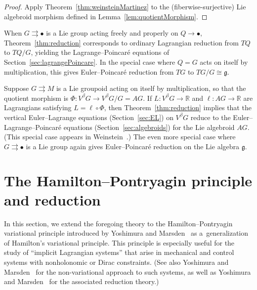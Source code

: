\documentclass[pdftex]{sigma}
\numberwithin{equation}{section}
\begin{document}
\begin{proof}
Apply Theorem~\ref{thm:weinsteinMartinez} to the (f\/iberwise-surjective) Lie algebroid morphism def\/ined in Lemma~\ref{lem:quotientMorphism}.
\end{proof}

\begin{Example} \label{ex:groupActionReduction}
When $G \rightrightarrows \bullet $ is a Lie group acting freely and properly on $ Q \rightarrow \bullet $, Theorem~\ref{thm:reduction} corresponds to ordinary Lagrangian reduction from $ T Q $ to $ T Q / G $, yielding the Lagrange--Poincar\'e equations of Section~\ref{sec:lagrangePoincare}. In the special case where $ Q = G $ acts on itself by multiplication, this gives Euler--Poincar\'e reduction from $ T G $ to $ T G / G \cong \mathfrak{g} $.
\end{Example}

\begin{Example}\label{ex:groupoidSelfReduction}
Suppose $G \rightrightarrows M $ is a Lie groupoid acting on itself by multiplication, so that the quotient morphism is $ \Phi \colon V ^\beta G \rightarrow V ^\beta G / G = A G $. If $ L \colon V ^\beta G \rightarrow \mathbb{R} $ and $ \ell \colon A G \rightarrow \mathbb{R} $ are Lagrangians satisfying $ L = \ell \circ \Phi $, then Theorem~\ref{thm:reduction} implies that the vertical Euler--Lagrange equations (Section~\ref{sec:EL}) on $ V ^\beta G $ reduce to the Euler--Lagrange--Poincar\'e equations (Section~\ref{sec:algebroids}) for the Lie algebroid $ A G $. (This special case appears in Weinstein~\cite[Theorem~5.3]{Weinstein1996}.) The even more special case where $ G \rightrightarrows \bullet $ is a Lie group again gives Euler--Poincar\'e reduction on the Lie algebra $ \mathfrak{g} $.
\end{Example}

\section{The Hamilton--Pontryagin principle and reduction}\label{sec:HP}

In this section, we extend the foregoing theory to the Hamilton--Pontryagin variational principle introduced by Yoshimura and Marsden~\cite{YoMa2006b} as a~generalization of Hamilton's variational principle. This principle is especially useful for the study of ``implicit Lagrangian systems'' that arise in mechanical and control systems with nonholonomic or Dirac constraints. (See also Yoshimura and Marsden~\cite{YoMa2006a} for the non-variational approach to such systems, as well as Yoshimura and Marsden~\cite{YoMa2007} for the associated reduction theory.)
\end{document}
